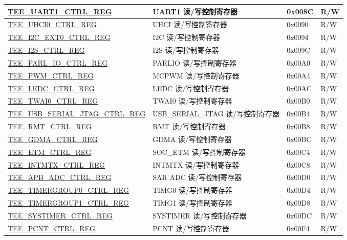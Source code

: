 \begin{longtable}{ | l | L{5cm} | p{2.2cm} | p{1cm} | }
\hyperref[regdesc:TEEUART1CTRLREG]{TEE\_UART1\_CTRL\_REG} & UART1 读/写控制寄存器 & 0x008C & R/W \\ \hline
\hyperref[regdesc:TEEUHCI0CTRLREG]{TEE\_UHCI0\_CTRL\_REG} & UHCI 读/写控制寄存器 & 0x0090 & R/W \\ \hline
\hyperref[regdesc:TEEI2CEXT0CTRLREG]{TEE\_I2C\_EXT0\_CTRL\_REG} & I2C 读/写控制寄存器 & 0x0094 & R/W \\ \hline
\hyperref[regdesc:TEEI2SCTRLREG]{TEE\_I2S\_CTRL\_REG} & I2S 读/写控制寄存器 & 0x009C & R/W \\ \hline
\hyperref[regdesc:TEEPARLIOCTRLREG]{TEE\_PARL\_IO\_CTRL\_REG} & PARLIO 读/写控制寄存器 & 0x00A0 & R/W \\ \hline
\hyperref[regdesc:TEEPWMCTRLREG]{TEE\_PWM\_CTRL\_REG} & MCPWM 读/写控制寄存器 & 0x00A4 & R/W \\ \hline
\hyperref[regdesc:TEELEDCCTRLREG]{TEE\_LEDC\_CTRL\_REG} & LEDC 读/写控制寄存器 & 0x00AC & R/W \\ \hline
\hyperref[regdesc:TEETWAI0CTRLREG]{TEE\_TWAI0\_CTRL\_REG} & TWAI0 读/写控制寄存器 & 0x00B0 & R/W \\ \hline
\hyperref[regdesc:TEEUSBSERIALJTAGCTRLREG]{TEE\_USB\_SERIAL\_JTAG\_CTRL\_REG} & USB\_SERIAL\_JTAG 读/写控制寄存器 & 0x00B4 & R/W \\ \hline
\hyperref[regdesc:TEERMTCTRLREG]{TEE\_RMT\_CTRL\_REG} & RMT 读/写控制寄存器 & 0x00B8 & R/W \\ \hline
\hyperref[regdesc:TEEGDMACTRLREG]{TEE\_GDMA\_CTRL\_REG} & GDMA 读/写控制寄存器 & 0x00BC & R/W \\ \hline
\hyperref[regdesc:TEEETMCTRLREG]{TEE\_ETM\_CTRL\_REG} & SOC\_ETM 读/写控制寄存器 & 0x00C4 & R/W \\ \hline
\hyperref[regdesc:TEEINTMTXCTRLREG]{TEE\_INTMTX\_CTRL\_REG} & INTMTX 读/写控制寄存器 & 0x00C8 & R/W \\ \hline
\hyperref[regdesc:TEEAPBADCCTRLREG]{TEE\_APB\_ADC\_CTRL\_REG} & SAR ADC 读/写控制寄存器 & 0x00D0 & R/W \\ \hline
\hyperref[regdesc:TEETIMERGROUP0CTRLREG]{TEE\_TIMERGROUP0\_CTRL\_REG} & TIMG0 读/写控制寄存器 & 0x00D4 & R/W \\ \hline
\hyperref[regdesc:TEETIMERGROUP1CTRLREG]{TEE\_TIMERGROUP1\_CTRL\_REG} & TIMG1 读/写控制寄存器 & 0x00D8 & R/W \\ \hline
\hyperref[regdesc:TEESYSTIMERCTRLREG]{TEE\_SYSTIMER\_CTRL\_REG} & SYSTIMER 读/写控制寄存器 & 0x00DC & R/W \\ \hline
\hyperref[regdesc:TEEPCNTCTRLREG]{TEE\_PCNT\_CTRL\_REG} & PCNT 读/写控制寄存器 & 0x00F4 & R/W \\ \hline

\end{longtable}
